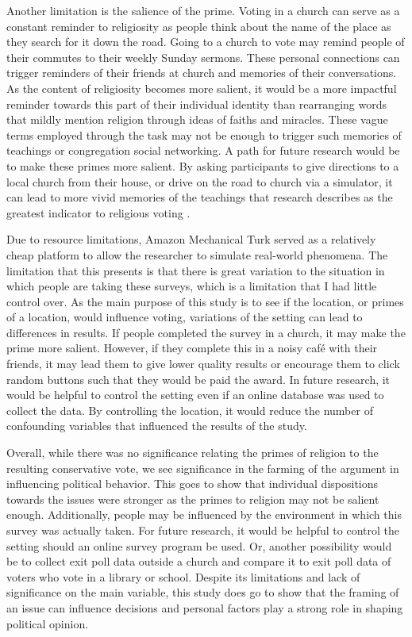 \documentclass[letterpaper,man,natbib,noextraspace,12pt]{apa6}  %
\begin{document}
Another limitation is the salience of the prime. Voting in a church can serve as a constant reminder to religiosity as people think about the name of the place as they search for it down the road. Going to a church to vote may remind people of their commutes to their weekly Sunday sermons. These personal connections can trigger reminders of their friends at church and memories of their conversations. As the content of religiosity becomes more salient, it would be a more impactful reminder towards this part of their individual identity than rearranging words that mildly mention religion through ideas of faiths and miracles. These vague terms employed through the task may not be enough to trigger such memories of teachings or congregation social networking. A path for future research would be to make these primes more salient. By asking participants to give directions to a local church from their house, or drive on the road to church via a simulator, it can lead to more vivid memories of the teachings that research describes as the greatest indicator to religious voting \citep{putnam_american_2010}.

Due to resource limitations, Amazon Mechanical Turk served as a relatively cheap platform to allow the researcher to simulate real-world phenomena. The limitation that this presents is that there is great variation to the situation in which people are taking these surveys, which is a limitation that I had little control over. As the main purpose of this study is to see if the location, or primes of a location, would influence voting, variations of the setting can lead to differences in results. If people completed the survey in a church, it may make the prime more salient. However, if they complete this in a noisy café with their friends, it may lead them to give lower quality results or encourage them to click random buttons such that they would be paid the award. In future research, it would be helpful to control the setting even if an online database was used to collect the data. By controlling the location, it would reduce the number of confounding variables that influenced the results of the study. 

Overall, while there was no significance relating the primes of religion to the resulting conservative vote, we see significance in the farming of the argument in influencing political behavior. This goes to show that individual dispositions towards the issues were stronger as the primes to religion may not be salient enough. Additionally, people may be influenced by the environment in which this survey was actually taken. For future research, it would be helpful to control the setting should an online survey program be used. Or, another possibility would be to collect exit poll data outside a church and compare it to exit poll data of voters who vote in a library or school. Despite its limitations and lack of significance on the main variable, this study does go to show that the framing of an issue can influence decisions and personal factors play a strong role in shaping political opinion. 


\end{document}
